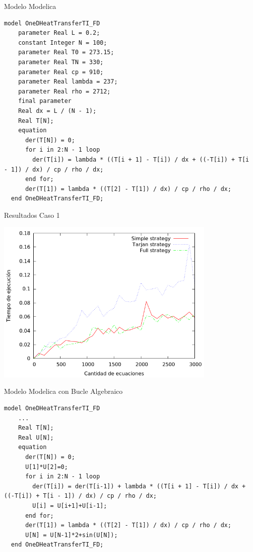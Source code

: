 \begin{frame}[fragile]{Modelo Modelica}
\fontsize{8pt}{7.2}\selectfont
\begin{lstlisting}[language=Modelica]
  model OneDHeatTransferTI_FD
    parameter Real L = 0.2;
    constant Integer N = 100;
    parameter Real T0 = 273.15;
    parameter Real TN = 330;
    parameter Real cp = 910;
    parameter Real lambda = 237;
    parameter Real rho = 2712;
    final parameter
    Real dx = L / (N - 1);
    Real T[N];
    equation
      der(T[N]) = 0;
      for i in 2:N - 1 loop
        der(T[i]) = lambda * ((T[i + 1] - T[i]) / dx + ((-T[i]) + T[i - 1]) / dx) / cp / rho / dx;
      end for;
      der(T[1]) = lambda * ((T[2] - T[1]) / dx) / cp / rho / dx;
  end OneDHeatTransferTI_FD; 
\end{lstlisting}
\end{frame}

\begin{frame}{Resultados Caso 1}
\begin{center}
\includegraphics[width=0.8\textwidth]{graphics/OneDHeatTransfer.png}
\end{center}
\end{frame}

\begin{frame}[fragile]{Modelo Modelica con Bucle Algebraico}
\fontsize{8pt}{7.2}\selectfont
\begin{lstlisting}[language=Modelica]
  model OneDHeatTransferTI_FD
    ...
    Real T[N];
    Real U[N]; 
    equation
      der(T[N]) = 0;
      U[1]*U[2]=0;
      for i in 2:N - 1 loop
        der(T[i]) = der(T[i-1]) + lambda * ((T[i + 1] - T[i]) / dx + ((-T[i]) + T[i - 1]) / dx) / cp / rho / dx;
        U[i] = U[i+1]+U[i-1]; 
      end for;
      der(T[1]) = lambda * ((T[2] - T[1]) / dx) / cp / rho / dx;
      U[N] = U[N-1]*2+sin(U[N]); 
  end OneDHeatTransferTI_FD; 
\end{lstlisting}
\end{frame}

